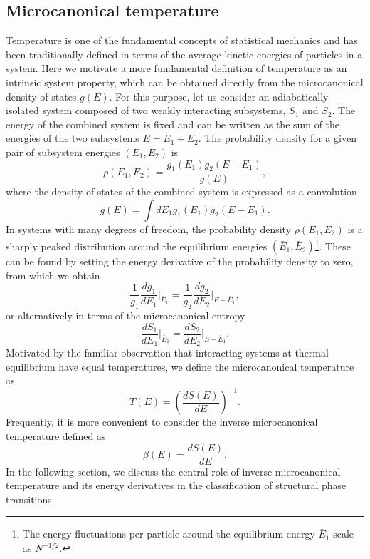 \documentclass[12pt]{report}
\begin{document}
\subsection{Microcanonical temperature}
Temperature is one of the fundamental concepts of statistical mechanics and has been traditionally defined in terms of the average kinetic energies of particles in a system. Here we motivate a more fundamental definition of temperature as an intrinsic system property, which can be obtained directly from the microcanonical density of states $g(E)$. For this purpose, let us consider an adiabatically isolated system composed of two weakly interacting subsystems, $S_{1}$ and $S_{2}$. The energy of the combined system is fixed and can be written as the sum of the energies of the two subsystems $E = E_{1} + E_{2}$. The probability density for a given pair of subsystem energies $(E_{1},E_{2})$ is  
\begin{equation}
\rho(E_{1},E_{2}) = \frac{g_{1}(E_{1})g_{2}(E-E_{1})}{g(E)},
\end{equation}
where the density of states of the combined system is expressed as a convolution
\begin{equation}
g(E) = \int dE_{1}g_{1}(E_{1})g_{2}(E-E_{1}).
\end{equation}
In systems with many degrees of freedom, the probability density $\rho(E_{1},E_{2})$ is a sharply peaked distribution around the equilibrium energies $(\bar{E}_{1},\bar{E}_{2})$\footnote{The energy fluctuations per particle around the equilibrium energy $\bar{E}_{1}$ scale as $N^{-1/2}$.}. These can be found by setting the energy derivative of the probability density to zero, from which we obtain
\begin{equation}
\frac{1}{g_{1}}\frac{dg_{1}}{dE_{1}}\bigg|_{\bar{E}_{1}} = \frac{1}{g_{2}}\frac{dg_{2}}{dE_{2}}\bigg|_{E - \bar{E}_{1}},
\end{equation}
or alternatively in terms of the microcanonical entropy
\begin{equation}
\frac{dS_{1}}{dE_1}\bigg|_{\bar{E}_{1}} = \frac{dS_{2}}{dE_{2}}\bigg|_{E - \bar{E}_{1}}.
\end{equation}
Motivated by the familiar observation that interacting systems at thermal equilibrium have equal temperatures, we define the microcanonical temperature as 
\begin{equation}
T(E) = \left(\frac{dS(E)}{dE}\right)^{-1}.
\end{equation}
Frequently, it is more convenient to consider the inverse microcanonical temperature defined as 
\begin{equation}
\beta(E) = \frac{dS(E)}{dE}.
\end{equation}
In the following section, we discuss the central role of inverse microcanonical temperature and its energy derivatives in the classification of structural phase transitions.
\end{document}
